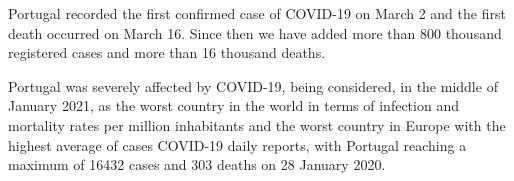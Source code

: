 

Portugal recorded the first confirmed case of COVID-19 on March 2 and the first death occurred
on March 16. Since then we have added more than 800 thousand registered cases and more than 16 thousand deaths.

Portugal was severely affected by COVID-19, being considered, in the middle of January 2021, as the worst country in the world in terms of infection and mortality rates per million inhabitants and the worst country in Europe with the highest average of cases COVID-19 daily reports, with Portugal reaching a maximum of 16432 cases and 303 deaths on 28 January 2020.